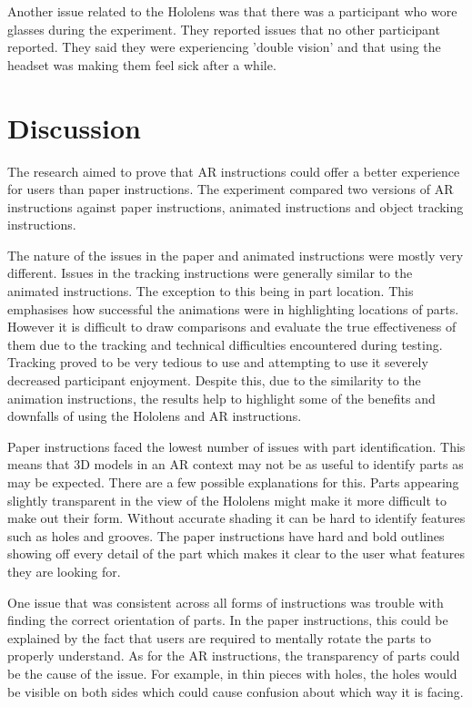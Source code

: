 \documentclass{l4proj}
\begin{document}
Another issue related to the Hololens was that there was a participant who wore glasses during the experiment. They reported issues that no other participant reported. They said they were experiencing 'double vision' and that using the headset was making them feel sick after a while.

\section{Discussion}

The research aimed to prove that AR instructions could offer a better experience for users than paper instructions. The experiment compared two versions of AR instructions against paper instructions, animated instructions and object tracking instructions. 

The nature of the issues in the paper and animated instructions were mostly very different. Issues in the tracking instructions were generally similar to the animated instructions. The exception to this being in part location. This emphasises how successful the animations were in highlighting locations of parts. However it is difficult to draw comparisons and evaluate the true effectiveness of them due to the tracking and technical difficulties encountered during testing. Tracking proved to be very tedious to use and attempting to use it severely decreased participant enjoyment. Despite this, due to the similarity to the animation instructions, the results help to highlight some of the benefits and downfalls of using the Hololens and AR instructions.

Paper instructions faced the lowest number of issues with part identification. This means that 3D models in an AR context may not be as useful to identify parts as may be expected. There are a few possible explanations for this. Parts appearing slightly transparent in the view of the Hololens might make it more difficult to make out their form. Without accurate shading it can be hard to identify features such as holes and grooves. The paper instructions have hard and bold outlines showing off every detail of the part which makes it clear to the user what features they are looking for.

One issue that was consistent across all forms of instructions was trouble with finding the correct orientation of parts. In the paper instructions, this could be explained by the fact that users are required to mentally rotate the parts to properly understand. As for the AR instructions, the transparency of parts could be the cause of the issue. For example, in thin pieces with holes, the holes would be visible on both sides which could cause confusion about which way it is facing. 
\end{document}
